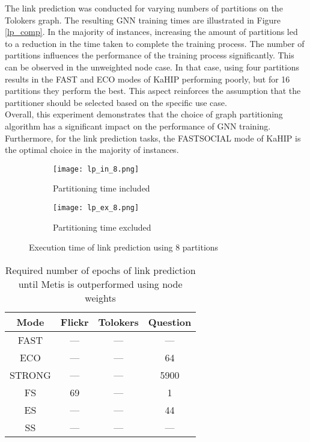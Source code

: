 \documentclass[acmsmall,nonacm,screen,review]{acmart}
\begin{document}
The link prediction was conducted for varying numbers of partitions on the Tolokers graph. The resulting GNN training times are illustrated in Figure \ref{lp_comp}. In the majority of instances, increasing the amount of partitions led to a reduction in the time taken to complete the training process. The number of partitions influences the performance of the training process significantly. This can be observed in the unweighted node case. In that case, using four partitions results in the FAST and ECO modes of KaHIP performing poorly, but for 16 partitions they perform the best. This aspect reinforces the assumption that the partitioner should be selected based on the specific use case.\\
Overall, this experiment demonstrates that the choice of graph partitioning algorithm has a significant impact on the performance of GNN training. Furthermore, for the link prediction tasks, the FASTSOCIAL mode of KaHIP is the optimal choice in the majority of instances.
\begin{figure}[bt!]
     \centering
     \begin{subfigure}[b]{0.45\textwidth}
         \centering
         \texttt{[image: lp\_in\_8.png]}
         \caption{Partitioning time included}
         \label{lp_in_4}
     \end{subfigure}
     \hfill
     \begin{subfigure}[b]{0.45\textwidth}
         \centering
         \texttt{[image: lp\_ex\_8.png]}
         \caption{Partitioning time excluded}
         \label{lp_ex_4}
     \end{subfigure}
     \caption{Execution time of link prediction using 8 partitions}
     \label{lp_results}
\end{figure}
\begin{table}[bt!]
\centering
\begin{tabular}{ cccc }
 \centering
  Mode & Flickr  & Tolokers & Question \\ 
 \hline
    FAST	&---	&---&--- \\
    ECO	&---	&---	&64 \\
    STRONG	&---	&---	&5900 \\
    FS	&69	&---&1 \\
    ES	&---	&---	&44 \\
    SS	&---&---&---\\

\end{tabular}
\caption{Required number of epochs of link prediction until Metis is outperformed using node weights}
\label{lp_epochs}
\end{table}
\end{document}
